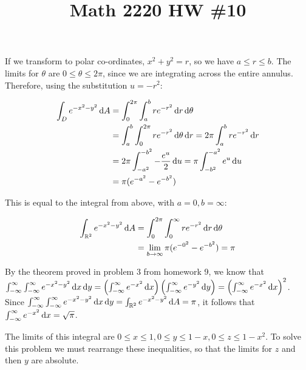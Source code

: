 

\title{Math 2220 HW \#10}
\author{\name}
\maketitle


If we transform to polar co-ordinates, $x^2 + y^2 = r$, so we have $a \leq r \leq b$. The limits for $\theta$ are $0 \leq \theta \leq 2\pi$, since we are integrating across the entire annulus. Therefore, using the substitution $u = -r^2$:

\begin{align*}
  \int_D e^{-x^2 - y^2} \diff A &= \int_0^{2\pi} \int_a^b r e^{-r^2} \diff r \diff \theta \\
  &= \int_a^b \int_0^{2\pi} r e^{-r^2} \diff \theta \diff r = 2\pi \int_a^b r e^{-r^2} \diff r \\
  &= 2\pi \int_{-a^2}^{-b^2} -\frac{e^u}{2} \diff u = \pi \int_{-b^2}^{-a^2} e^u \diff u \\
  &= \pi (e^{-a^2} - e^{-b^2})
\end{align*}

This is equal to the integral from above, with $a = 0, b = \infty$:

\begin{align*}
  \int_{\mathbb{R}^2} e^{-x^2 - y^2} \mathop{}\!\mathrm{d} A &= \int_0^{2\pi} \int_0^{\infty} r e^{-r^2} \mathop{}\!\mathrm{d} r \mathop{}\!\mathrm{d} \theta \\
  &= \lim_{b \rightarrow \infty} \pi (e^{-0^2} - e^{-b^2}) = \pi
\end{align*}

By the theorem proved in problem 3 from homework 9, we know that $\int_{-\infty}^{\infty} \int_{-\infty}^{\infty} e^{-x^2 - y^2} \mathop{}\!\mathrm{d} x \mathop{}\!\mathrm{d} y = \left(\int_{-\infty}^{\infty} e^{-x^2} \mathop{}\!\mathrm{d} x\right) \left(\int_{-\infty}^{\infty} e^{-y^2} \mathop{}\!\mathrm{d} y\right) = \left(\int_{-\infty}^{\infty} e^{-x^2} \mathop{}\!\mathrm{d} x\right)^2$. Since $\int_{-\infty}^{\infty} \int_{-\infty}^{\infty} e^{-x^2 - y^2} \mathop{}\!\mathrm{d} x \mathop{}\!\mathrm{d} y = \int_{\mathbb{R}^2} e^{-x^2 - y^2} \mathop{}\!\mathrm{d} A = \pi$, it follows that $\int_{-\infty}^{\infty} e^{-x^2} \mathop{}\!\mathrm{d} x = \sqrt{\pi}$.


The limits of this integral are $0 \leq x \leq 1, 0 \leq y \leq 1 - x, 0 \leq z \leq 1 - x^2$. To solve this problem we must rearrange these inequalities, so that the limits for $z$ and then $y$ are absolute.

